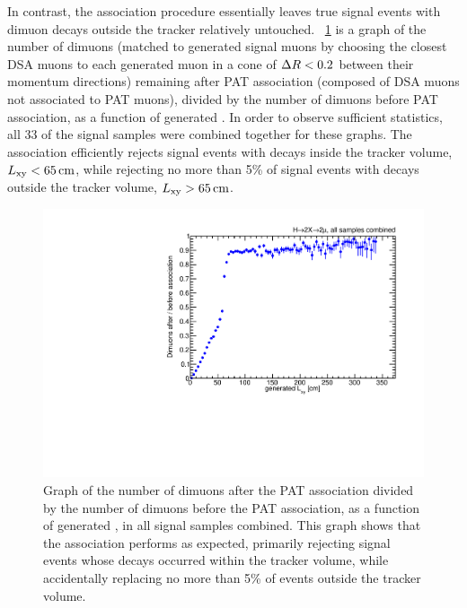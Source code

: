 In contrast, the association procedure essentially leaves true signal events with dimuon decays outside the tracker relatively untouched.
\Fig~\ref{fig:dd:REPEFF_Signal_Lxy} is a graph of the number of dimuons (matched to generated signal muons by choosing the closest DSA muons to each generated muon in a cone of $\Delta R < 0.2$ between their momentum directions) remaining after PAT association (\ie composed of DSA muons not associated to PAT muons), divided by the number of dimuons before PAT association, as a function of generated \Lxy.
In order to observe sufficient statistics, all 33 of the \twoMu signal samples were combined together for these graphs.
The association efficiently rejects signal events with decays inside the tracker volume, $L_{\mathrm{xy}} < 65\,\text{cm}$, while rejecting no more than 5\% of signal events with decays outside the tracker volume, $L_{\mathrm{xy}} > 65\,\text{cm}$.
\begin{figure}[htpb]
  \centering
  \includegraphics[width=\DFigWidth]{figures/displaced/REPEFF_Signal_Global.pdf}
  \caption{Graph of the number of dimuons after the PAT association divided by the number of dimuons before the PAT association, as a function of generated \Lxy, in all \twoMu signal samples combined. This graph shows that the association performs as expected, primarily rejecting signal events whose decays occurred within the tracker volume, while accidentally replacing no more than 5\% of events outside the tracker volume.}
  \label{fig:dd:REPEFF_Signal_Lxy}
\end{figure}


